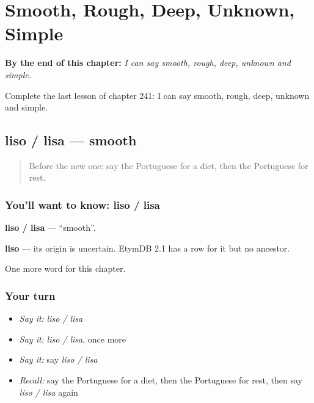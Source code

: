 
\chapter{Smooth, Rough, Deep, Unknown, Simple}
\label{ch:pt-smooth-rough-deep-unknown-simple}

\begin{chapteropening}
\textbf{By the end of this chapter:} \emph{I can say smooth, rough, deep, unknown and simple.}

Complete the last lesson of chapter 241: I can say smooth, rough, deep, unknown and simple.
\end{chapteropening}

\section[liso / lisa]{liso / lisa — smooth}

\label{lesson:PT-C241-liso-lisa}



\begin{quote}
Before the new one: say the Portuguese for a diet, then the Portuguese for rest.
\end{quote}

\subsection*{You'll want to know: liso / lisa}
\textbf{liso / lisa} — \textquotedblleft{}smooth\textquotedblright{}.

\begin{cousinweb}
\textbf{liso} — its origin is uncertain. EtymDB 2.1 has a row for it but no ancestor.
\end{cousinweb}

\begin{grammarlens}[title={What you've built}]
One more word for this chapter.
\end{grammarlens}

\subsection*{Your turn}
\begin{itemize}
\raggedright
  \item \emph{Say it:} \emph{liso / lisa}
  \item \emph{Say it:} \emph{liso / lisa}, once more
  \item \emph{Say it:} say \emph{liso / lisa}
  \item \emph{Recall:} say the Portuguese for a diet, then the Portuguese for rest, then say \emph{liso / lisa} again
\end{itemize}


